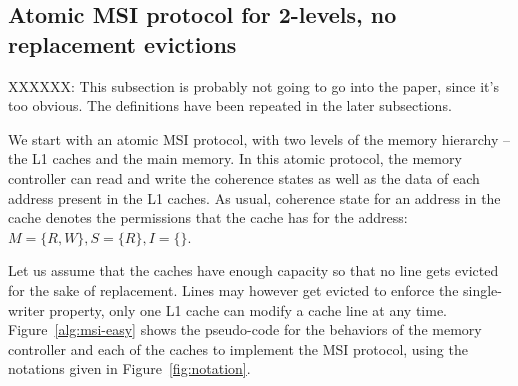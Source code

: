 \newcommand{\fourAngle}[5]{\text{$#1\langle#2,#3,#4,#5\rangle$}}
\newcommand{\ReqCore}[4]{\fourAngle{Req}{#1}{#2}{#3}{#4}}

\subsection{Atomic MSI protocol for 2-levels, no replacement evictions}

XXXXXX: This subsection is probably not going to go into the paper, since it's
too obvious. The definitions have been repeated in the later subsections.

We start with an atomic MSI protocol, with two levels of the memory hierarchy --
the L1 caches and the main memory. In this atomic protocol, the memory
controller can read and write the coherence states as well as the data of each
address present in the L1 caches. As usual, coherence state for an address in
the cache denotes the permissions that the cache has for the address: $M = \{R,
W\}, S = \{R\}, I = \{\}$.

Let us assume that the caches have enough capacity so that no line gets evicted
for the sake of replacement. Lines may however get evicted to enforce the
single-writer property, \ie only one L1 cache can modify a cache line at any
time. Figure~\ref{alg:msi-easy} shows the pseudo-code for the behaviors of the
memory controller and each of the caches to implement the MSI protocol, using
the notations given in Figure~\ref{fig:notation}. 

